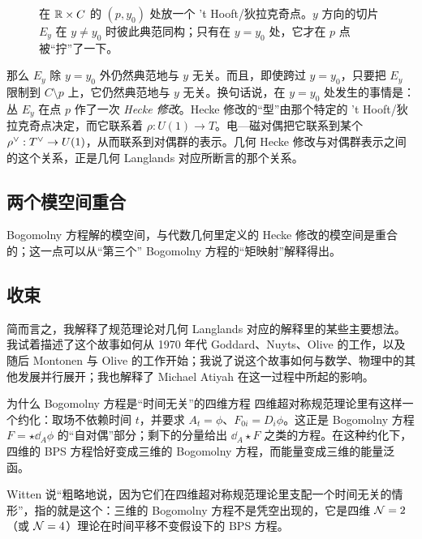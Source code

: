 \begin{figure}[htbp]
\centering
{}
\caption{在 $\mathbb{R}\times C$ 的 $(p,y_0)$ 处放一个 't Hooft/狄拉克奇点。$y$ 方向的切片 $E_y$ 在 $y\ne y_0$ 时彼此典范同构；只有在 $y=y_0$ 处，它才在 $p$ 点被“拧”了一下。}
\label{fig:hecke2}
\end{figure}

那么 $E_y$ 除 $y=y_0$ 外仍然典范地与 $y$ 无关。而且，即使跨过 $y=y_0$，只要把 $E_y$ 限制到 $C\setminus p$ 上，它仍然典范地与 $y$ 无关。换句话说，在 $y=y_0$ 处发生的事情是：丛 $E_y$ 在点 $p$ 作了一次 \emph{Hecke 修改}。Hecke 修改的“型”由那个特定的 't Hooft/狄拉克奇点决定，而它联系着 $\rho:U(1)\to T$。电—磁对偶把它联系到某个 $\rho^\vee:T^{\vee}\to U(1)$，从而联系到对偶群的表示。几何 Hecke 修改与对偶群表示之间的这个关系，正是几何 Langlands 对应所断言的那个关系。

\subsection{两个模空间重合}

Bogomolny 方程解的模空间，与代数几何里定义的 Hecke 修改的模空间是重合的；这一点可以从“第三个” Bogomolny 方程的“矩映射”解释得出。

\subsection{收束}

简而言之，我解释了规范理论对几何 Langlands 对应的解释里的某些主要想法。我试着描述了这个故事如何从 1970 年代 Goddard、Nuyts、Olive 的工作，以及随后 Montonen 与 Olive 的工作开始；我说了说这个故事如何与数学、物理中的其他发展并行展开；我也解释了 Michael Atiyah 在这一过程中所起的影响。

\begin{pizhu}{为什么 Bogomolny 方程是“时间无关”的四维方程}
四维超对称规范理论里有这样一个约化：取场不依赖时间 $t$，并要求 $A_t=\phi$、$F_{0i}=D_i\phi$。这正是 Bogomolny 方程 $F=\star\dd_A\phi$ 的“自对偶”部分；剩下的分量给出 $\dd_A\star F$ 之类的方程。在这种约化下，四维的 BPS 方程恰好变成三维的 Bogomolny 方程，而能量变成三维的能量泛函。

Witten 说“粗略地说，因为它们在四维超对称规范理论里支配一个时间无关的情形”，指的就是这个：三维的 Bogomolny 方程不是凭空出现的，它是四维 $\mathcal{N}=2$（或 $\mathcal{N}=4$）理论在时间平移不变假设下的 BPS 方程。
\end{pizhu}

